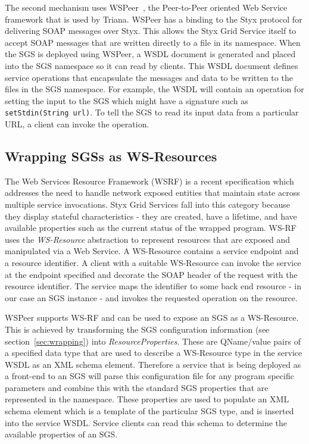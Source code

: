 \documentclass[a4paper]{article}
\begin{document}
The second mechanism uses WSPeer~\cite{wspeer}, the Peer-to-Peer oriented Web Service framework that is used by Triana. WSPeer has a binding to the Styx protocol for delivering SOAP messages over Styx. This allows the Styx Grid Service itself to accept SOAP messages that are written directly to a file in its namespace.  When the SGS is deployed using WSPeer, a WSDL document is generated and placed into the SGS namespace so it can read by clients. This WSDL document defines service operations that encapsulate the messages and data to be written to the files in the SGS namespace. For example, the WSDL will contain an operation for setting the input to the SGS which might have a signature such as  \texttt{setStdin(String url)}. To tell the SGS to read its input data from a particular URL, a client can invoke the operation. 

\subsection{Wrapping SGSs as WS-Resources}\label{subsec:ws-resources}

The Web Services Resource Framework (WSRF) is a recent specification which addresses the need to handle network exposed entities that maintain state across multiple service invocations. Styx Grid Services fall into this category because they display stateful characteristics - they are created, have a lifetime, and have available properties such as the current status of the wrapped program. WS-RF uses the \textit{WS-Resource} abstraction to represent resources that are exposed and manipulated via a Web Service. A WS-Resource contains a service endpoint and a resource identifier. A client with a suitable WS-Resource can invoke the service at the endpoint specified and decorate the SOAP header of the request with the resource identifier. The service maps the identifier to some back end resource - in our case an SGS instance - and invokes the requested operation on the resource.

WSPeer supports WS-RF and can be used to expose an SGS as a WS-Resource. This is achieved by transforming the SGS configuration information (see section~\ref{sec:wrapping}) into \textit{ResourceProperties\/}. These are QName/value pairs of a specified data type that are used to describe a WS-Resource type in the service WSDL as an XML schema element. Therefore a service that is being deployed as a front-end to an SGS will parse this configuration file for any program specific parameters and combine this with the standard SGS properties that are represented in the namespace. These properties are used to populate an XML schema element which is a template of the particular SGS type, and is inserted into the service WSDL. Service clients can read this schema to determine the available properties of an SGS.
\end{document}
